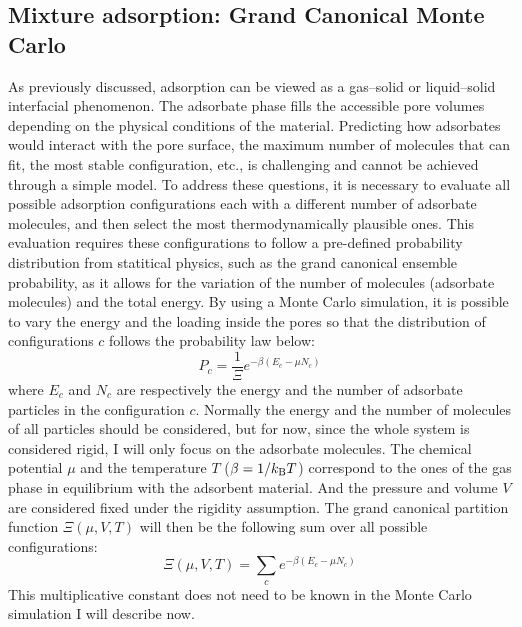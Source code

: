 \documentclass[main.tex]{subfiles}
\begin{document}
\subsection{Mixture adsorption: Grand Canonical Monte Carlo}\label{sct:GCMC}

As previously discussed, adsorption can be viewed as a gas--solid or liquid--solid interfacial phenomenon. The adsorbate phase fills the accessible pore volumes depending on the physical conditions of the material. Predicting how adsorbates would interact with the pore surface, the maximum number of molecules that can fit, the most stable configuration, etc., is challenging and cannot be achieved through a simple model. To address these questions, it is necessary to evaluate all possible adsorption configurations each with a different number of adsorbate molecules, and then select the most thermodynamically plausible ones. This evaluation requires these configurations to follow a pre-defined probability distribution from statitical physics, such as the grand canonical ensemble probability, as it allows for the variation of the number of molecules (adsorbate molecules) and the total energy. By using a Monte Carlo simulation, it is possible to vary the energy and the loading inside the pores so that the distribution of configurations $c$ follows the probability law below: 
\begin{equation}\label{eq:gc}
  P_c = \dfrac{1}{\Xi}e^{-\beta\left(E_c-\mu N_c\right)} 
\end{equation}
where $E_c$ and $N_c$ are respectively the energy and the number of adsorbate particles in the configuration $c$. Normally the energy and the number of molecules of all particles should be considered, but for now, since the whole system is considered rigid, I will only focus on the adsorbate molecules. The chemical potential $\mu$ and the temperature $T$ ($\beta=1/k_{\text{B}}T$) correspond to the ones of the gas phase in equilibrium with the adsorbent material. And the pressure and volume $V$ are considered fixed under the rigidity assumption. The grand canonical partition function $\Xi(\mu,V,T)$ will then be the following sum over all possible configurations: 
\begin{equation}
  \Xi(\mu,V,T) = \sum\limits_c e^{-\beta\left(E_c-\mu N_c\right)} 
\end{equation}
This multiplicative constant does not need to be known in the Monte Carlo simulation I will describe now. 
\end{document}
